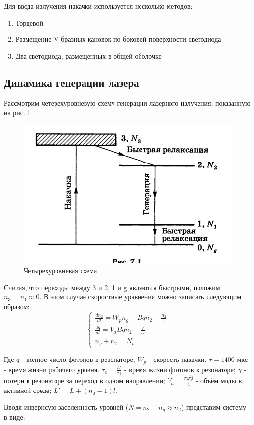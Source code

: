 \documentclass[a4paper]{article}
\begin{document}
Для ввода излучения накачки используется несколько методов:
\begin{enumerate}
\item Торцевой
\item Размещение V-бразных кановок по боковой поверхности светодиода
\item Два светодиода, размещенных в общей оболочке
\end{enumerate}

\subsection{Динамика генерации лазера}

Рассмотрим четерехуровневую схему генерации лазерного излучения, показанную на рис. \ref{fig:4_level}


\begin{figure}[H]
\centering
\includegraphics[width=0.5\linewidth]{4_level_scheme.png}
\caption{Четырехуровневая схема}
\label{fig:4_level}
\end{figure}

Считая, что переходы между 3 и 2, 1 и g являются быстрыми, положим $n_3 = n_1 \approx 0$. В этом случае скоростные уравнения можно записать следующим образом:
\begin{equation*}
\begin{cases}
\frac{dn_2}{dt} = W_p n_g - Bqn_2 - \frac{n_2}{\tau} \\
\frac{dq}{dt} = V_a B q n_2 - \frac{q}{\tau_c} \\
n_g + n_2 = N_t
\end{cases}
\end{equation*}

Где $q$ - полное число фотонов в резонаторе, $W_p$ - скорость накачки. $\tau = 1400$ мкс - время жизни рабочего уровня. $\tau_c = \frac{L'}{c \gamma}$ - время жизни фотонов в резонаторе; $\gamma$ - потери в резонаторе за переход в одном направлении; $V_a = \frac{\pi \omega_0^2 l}{4}$ - объём моды в активной среде; $L' = L + (n_0-1)l$. 

Вводя инвернсую заселенность уровней ($N = n_2 - n_g \approx n_2 $) представим систему в виде:
\end{document}
